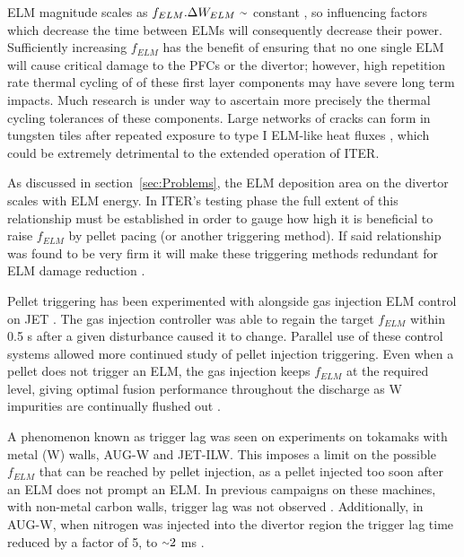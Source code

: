 \documentclass[11pt, twocolumn]{article}  %
\providecommand{\squiggle}{\raise.17ex\hbox{$\scriptstyle\sim$}} %
\newcommand{\citep}[1]{\cite{#1}}
\begin{document}
ELM magnitude scales as $f_{ELM}.\Delta W_{ELM}~\squiggle$ constant \cite{Loarte2002,Leonard1999,KirkFF}, so influencing factors which decrease the time between ELMs will consequently decrease their power. Sufficiently increasing $f_{ELM}$ has the benefit of ensuring that no one single ELM will cause critical damage to the PFCs or the divertor; however, high repetition rate thermal cycling of of these first layer components may have severe long term impacts. Much research is under way to ascertain more precisely the thermal cycling tolerances of these components. Large networks of cracks can form in tungsten tiles after repeated exposure to type I ELM-like heat fluxes \cite{Linke2011}, which could be extremely detrimental to the extended operation of ITER.

As discussed in section~\ref{sec:Problems}, the ELM deposition area on the divertor scales with ELM energy. In ITER's testing phase the full extent of this relationship must be established in order to gauge how high it is beneficial to raise $f_{ELM}$ by pellet pacing (or another triggering method). If said relationship was found to be very firm it will make these triggering methods redundant for ELM damage reduction \cite{Lang2013}.

Pellet triggering has been experimented with alongside gas injection ELM control on JET \cite{Lennholm2015}. The gas injection controller was able to regain the target $f_{ELM}$ within 0.5 s after a given disturbance caused it to change. Parallel use of these control systems allowed more continued study of pellet injection triggering. Even when a pellet does not trigger an ELM, the gas injection keeps $f_{ELM}$ at the required level, giving optimal fusion performance throughout the discharge as W impurities are continually flushed out \cite{Lennholm2015}.

A phenomenon known as trigger lag was seen on experiments on tokamaks with metal (W) walls, AUG-W and JET-ILW. This imposes a limit on the possible $f_{ELM}$ that can be reached by pellet injection, as a pellet injected too soon after an ELM does not prompt an ELM. In previous campaigns on these machines, with non-metal carbon walls, trigger lag was not observed \cite{Baylor2015}. Additionally, in AUG-W, when nitrogen was injected into the divertor region the trigger lag time reduced by a factor of 5, to $\squiggle 2$ ms \citep{Baylor2015}. 
\end{document}
